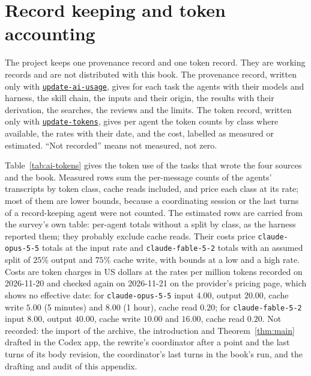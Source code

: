 \documentclass[11pt]{amsbook}
\theoremstyle{plain}
\theoremstyle{definition}
\theoremstyle{remark}
\numberwithin{equation}{section}
\numberwithin{figure}{chapter}
\numberwithin{table}{chapter}
\newcommand{\vtwoskillurl}{https://github.com/tdupu/%
agent-skills-public/blob/8d13efb5e66306aeae6e3b948bc463e7e2db1b65}
\newcommand{\vtwoskill}[1]{%
\href{\vtwoskillurl/skills/#1/SKILL.md}{\texttt{#1}}}
\begin{document}
\section{Record keeping and token accounting}
\label{sec:ai-records}
The project keeps one provenance record and one token record. They
are working records and are not distributed with this book. The
provenance record, written only with \vtwoskill{update-ai-usage},
gives for each task the agents with their models and harness, the
skill chain, the inputs and their origin, the results with their
derivation, the searches, the reviews and the limits. The token
record, written only with \vtwoskill{update-tokens}, gives per agent
the token counts by class where available, the rates with their date,
and the cost, labelled as measured or estimated. ``Not recorded''
means not measured, not zero.

Table~\ref{tab:ai-tokens} gives the token use of the tasks that wrote
the four sources and the book. Measured rows sum the per-message
counts of the agents' transcripts by token class, cache reads
included, and price each class at its rate; most of them are lower
bounds, because a coordinating session or the last turns of a
record-keeping agent were not counted. The estimated rows are carried
from the survey's own table: per-agent totals without a split by
class, as the harness reported them; they probably exclude cache
reads. Their costs price \texttt{claude-opus-5-5} totals at the input
rate and \texttt{claude-fable-5-2} totals with an assumed split of
$25\%$ output and $75\%$ cache write, with bounds at a low and a high
rate. Costs are token charges in US dollars at the rates per million
tokens recorded on 2026-11-20 and checked again on 2026-11-21 on the
provider's pricing page, which shows no effective date: for
\texttt{claude-opus-5-5} input $4.00$, output $20.00$, cache write
$5.00$ (5 minutes) and $8.00$ (1 hour), cache read $0.20$; for
\texttt{claude-fable-5-2} input $8.00$, output $40.00$, cache write
$10.00$ and $16.00$, cache read $0.20$. Not recorded: the import of
the archive, the introduction and Theorem~\ref{thm:main} drafted in
the Codex app, the rewrite's coordinator after a point and the last
turns of its body revision, the coordinator's last turns in the book's
run, and the drafting and audit of this appendix.
\end{document}
